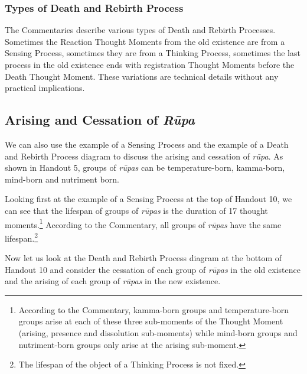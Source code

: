 \subsubsection*{Types of Death and Rebirth Process}

The Commentaries describe various types of Death and Rebirth Processes. Sometimes the Reaction Thought Moments from the old existence are from a Sensing Process, sometimes they are from a Thinking Process, sometimes the last process in the old existence ends with registration Thought Moments before the Death Thought Moment. These variations are technical details without any practical implications.

\subsection*{Arising and Cessation of \textit{Rūpa}}

We can also use the example of a Sensing Process and the example of a Death and Rebirth Process diagram to discuss the arising and cessation of \textit{rūpa}. As shown in Handout 5, groups of \textit{rūpas} can be temperature-born, kamma-born, mind-born and nutriment born.

Looking first at the example of a Sensing Process at the top of Handout 10, we can see that the lifespan of groups of \textit{rūpas} is the duration of 17 thought moments.\footnote{According to the Commentary, kamma-born groups and temperature-born groups arise at each of these three sub-moments of the Thought Moment (arising, presence and dissolution sub-moments) while mind-born groups and nutriment-born groups only arise at the arising sub-moment.} According to the Commentary, all groups of \textit{rūpas} have the same lifespan.\footnote{The lifespan of the object of a Thinking Process is not fixed.}

Now let us look at the Death and Rebirth Process diagram at the bottom of Handout 10 and consider the cessation of each group of \textit{rūpas} in the old existence and the arising of each group of \textit{rūpas} in the new existence. 


